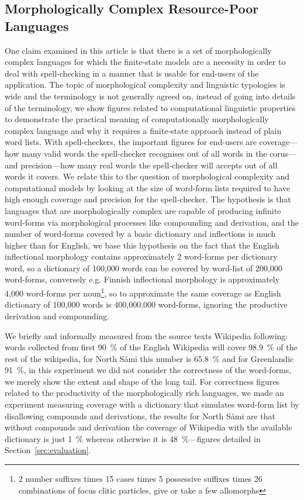 \documentclass[a4paper,12pt]{article}
\begin{document}
\subsection{Morphologically Complex Resource-Poor Languages}
\label{subsec:morphologically-complex}

One claim examined in this article is that there is a set of morphologically
complex languages for which the finite-state models are a necessity in order to
deal with spell-checking in a manner that is usable for end-users of the
application.  The topic of morphological complexity and linguistic typologies
is wide and the terminology is not generally agreed on, instead of going into
details of the terminology, we show figures related to computational linguistic
properties to demonstrate the practical meaning of computationally
morphologically complex language and why it requires a finite-state approach
instead of plain word lists. With spell-checkers, the important figures for
end-users are coverage---how many valid words the spell-checker recognises out
of all words in the corus---and precision---how many real words the
spell-checker will accepts out of all words it covers.  We relate this to the
question of morphological complexity and computational models by looking at the
size of word-form lists required to have high enough coverage and precision for
the spell-checker. The hypothesis is that languages that are morphologically
complex are capable of producing infinite word-forms via morphological
processes like compounding and derivation, and the number of word-forms covered
by a basic dictionary and inflections is much higher than for English, we base
this hypothesis on the fact that the English inflectional morphology contains
approximately 2 word-forms per dictionary word, so a dictionary of 100,000
words can be covered by word-list of 200,000 word-forms, conversely e.g.
Finnish inflectional morphology is approximately 4,000 word-forms per
noun\footnote{2 number suffixes times 15 cases times 5 possessive suffixes
times 26 combinations of focus clitic particles, give or take a few
allomorphs}, so to approximate the same coverage as English dictionary of
100,000 words is 400,000,000 word-forms, ignoring the productive derivation and
compounding.

We briefly and informally measured from the source texts Wikipedia following:
words collected from first 90~\% of the English Wikipedia will cover 98.9~\%
of the rest of the wikipedia, for North Sámi this number is 65.8~\% and for
Greenlandic 91~\%, in this experiment we did not consider the correctness
of the word-forms, we merely show the extent and shape of the long tail. For
correctness figures related to the productivity of the morphologically
rich languages, we made an experiment measuring coverage with a dictionary
that simulates word-form list by disallowing compounds and derivations, the
results for North Sámi are that without compounds and derivation the
coverage of Wikipedia with the available dictionary is just 1~\% whereas
otherwise it is 48~\%---figures detailed in Section~\ref{sec:evaluation}.
\end{document}
